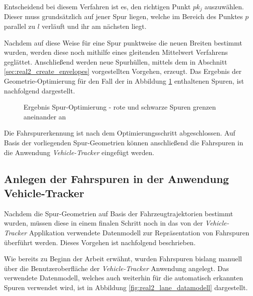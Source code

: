 Entscheidend bei diesem Verfahren ist es, den richtigen Punkt $pk_j$ auszuwählen. Dieser muss grundsätzlich
auf jener Spur liegen, welche im Bereich des Punktes $p$ parallel zu $l$ verläuft und ihr am nächsten liegt.

Nachdem auf diese Weise für eine Spur punktweise die neuen Breiten bestimmt wurden, werden diese noch mithilfe
eines gleitenden Mittelwert Verfahrens geglättet. Anschließend werden neue Spurhüllen, mittels dem in
Abschnitt \ref{sec:real2_create_envelopes} vorgestellten Vorgehen, erzeugt.
Das Ergebnis der Geometrie-Optimierung für den Fall der in Abbildung \ref{fig:real2_post_opt} enthaltenen Spuren,
ist nachfolgend dargestellt.

\begin{figure}[H]
    \centering
    \caption[Ergebnis Spur-Optimierung]
            {Ergebnis Spur-Optimierung - rote und schwarze Spuren grenzen aneinander an}
    \label{fig:real2_post_opt}
\end{figure}

Die Fahrspurerkennung ist nach dem Optimierungsschritt abgeschlossen. Auf Basis der vorliegenden
Spur-Geometrien können anschließend die Fahrspuren in die Anwendung \textit{Vehicle-Tracker} eingefügt werden.

\subsection{Anlegen der Fahrspuren in der Anwendung Vehicle-Tracker}

Nachdem die Spur-Geometrien auf Basis der Fahrzeugtrajektorien bestimmt wurden, müssen diese in einem
finalen Schritt noch in das von der \textit{Vehicle-Tracker} Applikation verwendete Datenmodell zur Repräsentation von
Fahrspuren überführt werden. Dieses Vorgehen ist nachfolgend beschrieben.

Wie bereits zu Beginn der Arbeit erwähnt, wurden Fahrspuren bislang manuell über die Benutzeroberfläche
der \textit{Vehicle-Tracker} Anwendung angelegt. Das verwendete Datenmodell, welches auch weiterhin
für die automatisch erkannten Spuren verwendet wird, ist in Abbildung \ref{fig:real2_lane_datamodell} dargestellt.

